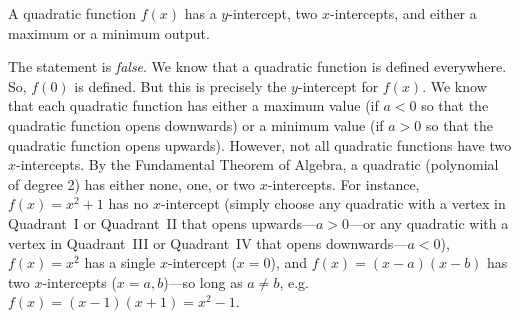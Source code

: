 \documentclass[11pt,letterpaper]{article}
\begin{document}
 A quadratic function $f(x)$ has a $y$-intercept, two $x$-intercepts, and either a maximum or a minimum output. \pspace

\sol The statement is \textit{false}. We know that a quadratic function is defined everywhere. So, $f(0)$ is defined. But this is precisely the $y$-intercept for $f(x)$. We know that each quadratic function has either a maximum value (if $a < 0$ so that the quadratic function opens downwards) or a minimum value (if $a > 0$ so that the quadratic function opens upwards). However, not all quadratic functions have two $x$-intercepts. By the Fundamental Theorem of Algebra, a quadratic (polynomial of degree 2) has either none, one, or two $x$-intercepts. For instance, $f(x)= x^2 + 1$ has no $x$-intercept (simply choose any quadratic with a vertex in Quadrant~I or Quadrant~II that opens upwards---$a>0$---or any quadratic with a vertex in Quadrant~III or Quadrant~IV that opens downwards---$a<0$), $f(x)= x^2$ has a single $x$-intercept ($x= 0$), and $f(x)= (x - a)(x - b)$ has two $x$-intercepts ($x= a, b$)---so long as $a \neq b$, e.g. $f(x)= (x - 1)(x + 1)= x^2 - 1$. \par\vspace{1.3cm} 



%







\end{document}
